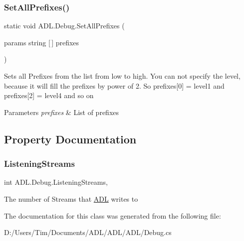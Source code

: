 \subsubsection{\texorpdfstring{Set\+All\+Prefixes()}{SetAllPrefixes()}}
{\footnotesize\ttfamily static void A\+D\+L.\+Debug.\+Set\+All\+Prefixes (\begin{DoxyParamCaption}\item[{params string \mbox{[}$\,$\mbox{]}}]{prefixes }\end{DoxyParamCaption})\hspace{0.3cm}{\ttfamily [static]}}



Sets all Prefixes from the list from low to high. You can not specify the level, because it will fill the prefixes by power of 2. So prefixes\mbox{[}0\mbox{]} = level1 and prefixes\mbox{[}2\mbox{]} = level4 and so on 


\begin{DoxyParams}{Parameters}
{\em prefixes} & List of prefixes\\
\hline
\end{DoxyParams}


\subsection{Property Documentation}
\mbox{\label{class_a_d_l_1_1_debug_aaa46716e2c6ca9520b6b132efdb0abd2}} 
\subsubsection{\texorpdfstring{Listening\+Streams}{ListeningStreams}}
{\footnotesize\ttfamily int A\+D\+L.\+Debug.\+Listening\+Streams\hspace{0.3cm}{\ttfamily [static]}, {\ttfamily [get]}}



The number of Streams that \mbox{\hyperlink{namespace_a_d_l}{A\+DL}} writes to 



The documentation for this class was generated from the following file\+:\begin{DoxyCompactItemize}
\item 
D\+:/\+Users/\+Tim/\+Documents/\+A\+D\+L/\+A\+D\+L/\+A\+D\+L/Debug.\+cs\end{DoxyCompactItemize}
